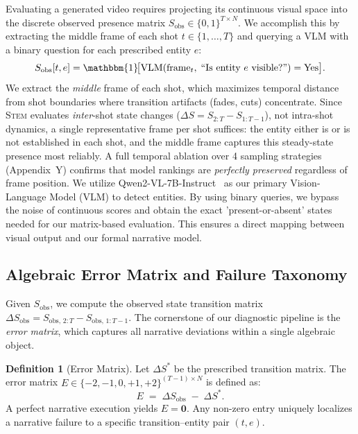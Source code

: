 \documentclass[sigconf,review,anonymous]{acmart}
\theoremstyle{definition}
\newtheorem{definition}{Definition}[section]
\newcommand{\stem}{\textsc{Stem}}
\begin{document}
Evaluating a generated video requires projecting its continuous visual space into the discrete observed presence matrix $S_\text{obs} \in \{0,1\}^{T \times N}$. We accomplish this by extracting the middle frame of each shot $t \in \{1, \ldots, T\}$ and querying a VLM with a binary question for each prescribed entity $e$:
\begin{equation}
S_\text{obs}[t, e] = \mathbbm{1}\!\bigl[\text{VLM}(\text{frame}_t,\;\text{``Is entity } e \text{ visible?''}) = \text{Yes}\bigr].
\label{eq:vlm_probe}
\end{equation}
We extract the \emph{middle} frame of each shot, which maximizes temporal distance from shot boundaries where transition artifacts (fades, cuts) concentrate. Since \stem{} evaluates \emph{inter}-shot state changes ($\Delta S = S_{2:T} - S_{1:T-1}$), not intra-shot dynamics, a single representative frame per shot suffices: the entity either is or is not established in each shot, and the middle frame captures this steady-state presence most reliably. A full temporal ablation over 4 sampling strategies (Appendix~Y) confirms that model rankings are \emph{perfectly preserved} regardless of frame position. We utilize Qwen2-VL-7B-Instruct~\cite{qwen2vl} as our primary Vision-Language Model (VLM) to detect entities. By using binary queries, we bypass the noise of continuous scores and obtain the exact 'present-or-absent' states needed for our matrix-based evaluation. This ensures a direct mapping between visual output and our formal narrative model.

\subsection{Algebraic Error Matrix and Failure Taxonomy}
\label{sec:error_taxonomy}

Given $S_\text{obs}$, we compute the observed state transition matrix $\Delta S_\text{obs} = S_{\text{obs},\,2:T} - S_{\text{obs},\,1:T\!-\!1}$. The cornerstone of our diagnostic pipeline is the \emph{error matrix}, which captures all narrative deviations within a single algebraic object.


\begin{definition}[Error Matrix]
\label{def:error_matrix}
Let $\Delta S^*$ be the prescribed transition matrix. The error matrix $E \in \{-2, -1, 0, +1, +2\}^{(T-1) \times N}$ is defined as:
\begin{equation}
E \;=\; \Delta S_\text{obs} \;-\; \Delta S^*.
\label{eq:error_matrix}
\end{equation}
A perfect narrative execution yields $E = \mathbf{0}$. Any non-zero entry uniquely localizes a narrative failure to a specific transition--entity pair $(t, e)$.
\end{definition}
\end{document}
